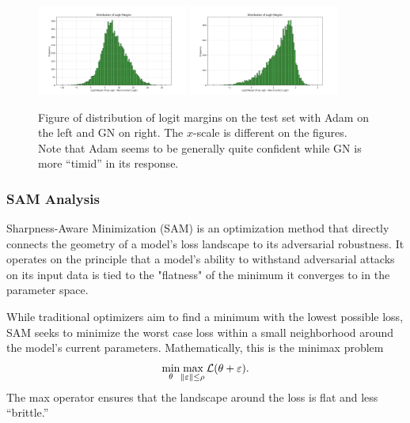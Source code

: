 \documentclass{article}
\begin{document}
    \begin{figure}[ht]
        \centering
        \includegraphics[width=0.44\textwidth]{../src/outputs/2025-09-10/23-05-38/logit_margin_distribution.png}
        \includegraphics[width=0.44\textwidth]{../src/outputs/2025-09-10/23-05-59/logit_margin_distribution.png}
        \caption{Figure of distribution of logit margins on the test set with Adam on the left and GN on right.
        The $x$-scale is different on the figures.
        Note that Adam seems to be generally quite confident while GN is more ``timid'' in its response.}
        \label{fig:logit-margin}
    \end{figure}

    \subsubsection{SAM Analysis}
    Sharpness-Aware Minimization (SAM) is an optimization method that directly connects the geometry of a model's loss landscape to its adversarial robustness.
    It operates on the principle that a model's ability to withstand adversarial attacks on its input data is tied to the "flatness" of the minimum it converges to in the parameter space.

    While traditional optimizers aim to find a minimum with the lowest possible loss, SAM seeks to minimize the worst case loss within a small neighborhood around the model's current parameters.
    Mathematically, this is the minimax problem
    \begin{align*}
        \min_{\theta} \max_{\norm{\varepsilon} \le \rho} \mathcal L(\theta + \varepsilon).
    \end{align*}
    The max operator ensures that the landscape around the loss is flat and less ``brittle.''
\end{document}
